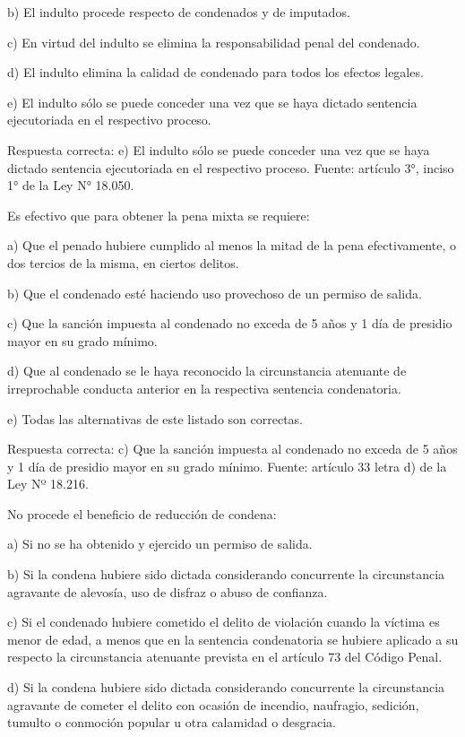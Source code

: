 \documentclass[letterpaper, 11pt]{article}
\begin{document}
b) El indulto procede respecto de condenados y de imputados.

c) En virtud del indulto se elimina la responsabilidad penal del condenado.

d) El indulto elimina la calidad de condenado para todos los efectos legales.

e) El indulto sólo se puede conceder una vez que se haya dictado sentencia ejecutoriada en
el respectivo proceso.

Respuesta correcta:
e) El indulto sólo se puede conceder una vez que se haya dictado
sentencia ejecutoriada en el respectivo proceso.
Fuente: artículo 3°, inciso 1° de la Ley N° 18.050.

Es efectivo que para obtener la pena mixta se requiere:

a) Que el penado hubiere cumplido al menos la mitad de la pena efectivamente, o dos
tercios de la misma, en ciertos delitos.

b) Que el condenado esté haciendo uso provechoso de un permiso de salida.

c) Que la sanción impuesta al condenado no exceda de 5 años y 1 día de presidio mayor en
su grado mínimo.

d) Que al condenado se le haya reconocido la circunstancia atenuante de irreprochable
conducta anterior en la respectiva sentencia condenatoria.

e) Todas las alternativas de este listado son correctas.

Respuesta correcta:
c) Que la sanción impuesta al condenado no exceda de 5 años y 1 día
de presidio mayor en su grado mínimo.
Fuente: artículo 33 letra d) de la Ley Nº 18.216.

No procede el beneficio de reducción de condena:

a) Si no se ha obtenido y ejercido un permiso de salida.

b) Si la condena hubiere sido dictada considerando concurrente la circunstancia agravante
de alevosía, uso de disfraz o abuso de confianza.

c) Si el condenado hubiere cometido el delito de violación cuando la víctima es menor de
edad, a menos que en la sentencia condenatoria se hubiere aplicado a su respecto la
circunstancia atenuante prevista en el artículo 73 del Código Penal.

d) Si la condena hubiere sido dictada considerando concurrente la circunstancia agravante
de cometer el delito con ocasión de incendio, naufragio, sedición, tumulto o conmoción
popular u otra calamidad o desgracia.
\end{document}
